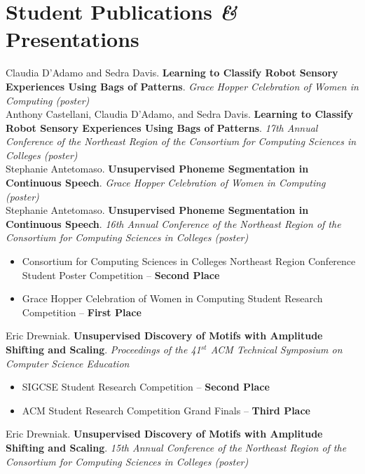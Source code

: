 \documentclass[12pt]{article}
\newcommand{\amper}{{\fontspec[Scale=.95]{Adobe Caslon Pro}\selectfont\itshape\&}}
\newcommand{\years}[1]{\marginpar{\scriptsize #1}}
\begin{document}
\section*{Student Publications \amper{} Presentations}
\noindent
\years{2012}Claudia D'Adamo and Sedra Davis. {\bf Learning to Classify Robot Sensory Experiences Using Bags of Patterns}.  {\em Grace Hopper Celebration of Women in Computing (poster)}\\[0.3cm]
Anthony Castellani, Claudia D'Adamo, and Sedra Davis. {\bf Learning to Classify Robot Sensory Experiences Using Bags of Patterns}. {\em 17th Annual Conference of the Northeast Region of the Consortium for Computing Sciences in Colleges (poster)}\\[0.3cm]
\noindent
\years{2011}Stephanie Antetomaso. {\bf Unsupervised Phoneme Segmentation in Continuous Speech}.  {\em Grace Hopper Celebration of Women in Computing (poster)}\\[0.3cm]
Stephanie Antetomaso. {\bf Unsupervised Phoneme Segmentation in Continuous Speech}.  {\em 16th Annual Conference of the Northeast Region of the Consortium for Computing Sciences in Colleges (poster)}\vspace{-0.1cm}
\begin{itemize}
  \setlength{\itemsep}{1pt}
  \setlength{\parskip}{0pt}
  \setlength{\parsep}{0pt}
  \item Consortium for Computing Sciences in Colleges Northeast Region Conference Student Poster Competition -- {\bf Second Place}
  \item Grace Hopper Celebration of Women in Computing Student Research Competition -- {\bf First Place}
\end{itemize}
\noindent
\years{2010}Eric Drewniak.  {\bf Unsupervised Discovery of Motifs with Amplitude Shifting and Scaling}.  {\em Proceedings of the 41$^{st}$ ACM Technical Symposium on Computer Science Education}
\begin{itemize}
  \setlength{\itemsep}{1pt}
  \setlength{\parskip}{0pt}
  \setlength{\parsep}{0pt}
  \item  SIGCSE  Student Research Competition -- {\bf Second Place}%
  \item ACM Student Research Competition Grand Finals -- {\bf Third Place}
\end{itemize}
Eric Drewniak.  {\bf Unsupervised Discovery of Motifs with Amplitude Shifting and Scaling}.  {\em 15th Annual Conference of the Northeast Region of the Consortium for Computing Sciences in Colleges (poster)}
\end{document}
